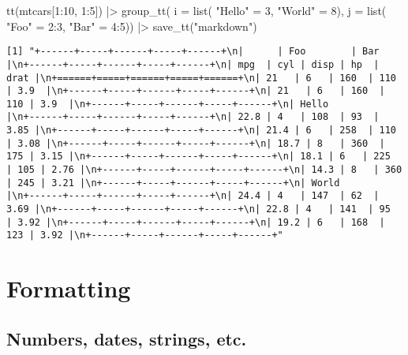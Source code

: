\documentclass[
  letterpaper,
  DIV=11,
  numbers=noendperiod]{scrartcl}
\newenvironment{Shaded}{\begin{snugshade}}{\end{snugshade}}
\newcommand{\AttributeTok}[1]{\textcolor[rgb]{0.40,0.45,0.13}{#1}}
\newcommand{\DecValTok}[1]{\textcolor[rgb]{0.68,0.00,0.00}{#1}}
\newcommand{\FunctionTok}[1]{\textcolor[rgb]{0.28,0.35,0.67}{#1}}
\newcommand{\NormalTok}[1]{\textcolor[rgb]{0.00,0.23,0.31}{#1}}
\newcommand{\OtherTok}[1]{\textcolor[rgb]{0.00,0.23,0.31}{#1}}
\newcommand{\SpecialCharTok}[1]{\textcolor[rgb]{0.37,0.37,0.37}{#1}}
\newcommand{\StringTok}[1]{\textcolor[rgb]{0.13,0.47,0.30}{#1}}
\begin{document}
\begin{Shaded}
\begin{Highlighting}[]
\FunctionTok{tt}\NormalTok{(mtcars[}\DecValTok{1}\SpecialCharTok{:}\DecValTok{10}\NormalTok{, }\DecValTok{1}\SpecialCharTok{:}\DecValTok{5}\NormalTok{]) }\SpecialCharTok{|\textgreater{}}
  \FunctionTok{group\_tt}\NormalTok{(}
    \AttributeTok{i =} \FunctionTok{list}\NormalTok{(}
      \StringTok{"Hello"} \OtherTok{=} \DecValTok{3}\NormalTok{,}
      \StringTok{"World"} \OtherTok{=} \DecValTok{8}\NormalTok{),}
    \AttributeTok{j =} \FunctionTok{list}\NormalTok{(}
      \StringTok{"Foo"} \OtherTok{=} \DecValTok{2}\SpecialCharTok{:}\DecValTok{3}\NormalTok{,}
      \StringTok{"Bar"} \OtherTok{=} \DecValTok{4}\SpecialCharTok{:}\DecValTok{5}\NormalTok{)) }\SpecialCharTok{|\textgreater{}}
  \FunctionTok{save\_tt}\NormalTok{(}\StringTok{"markdown"}\NormalTok{)}
\end{Highlighting}
\end{Shaded}

\begin{verbatim}
[1] "+------+-----+------+-----+------+\n|      | Foo        | Bar        |\n+------+-----+------+-----+------+\n| mpg  | cyl | disp | hp  | drat |\n+======+=====+======+=====+======+\n| 21   | 6   | 160  | 110 | 3.9  |\n+------+-----+------+-----+------+\n| 21   | 6   | 160  | 110 | 3.9  |\n+------+-----+------+-----+------+\n| Hello                          |\n+------+-----+------+-----+------+\n| 22.8 | 4   | 108  | 93  | 3.85 |\n+------+-----+------+-----+------+\n| 21.4 | 6   | 258  | 110 | 3.08 |\n+------+-----+------+-----+------+\n| 18.7 | 8   | 360  | 175 | 3.15 |\n+------+-----+------+-----+------+\n| 18.1 | 6   | 225  | 105 | 2.76 |\n+------+-----+------+-----+------+\n| 14.3 | 8   | 360  | 245 | 3.21 |\n+------+-----+------+-----+------+\n| World                          |\n+------+-----+------+-----+------+\n| 24.4 | 4   | 147  | 62  | 3.69 |\n+------+-----+------+-----+------+\n| 22.8 | 4   | 141  | 95  | 3.92 |\n+------+-----+------+-----+------+\n| 19.2 | 6   | 168  | 123 | 3.92 |\n+------+-----+------+-----+------+"
\end{verbatim}

\section{Formatting}\label{formatting}

\subsection{Numbers, dates, strings,
etc.}\label{numbers-dates-strings-etc.}
\end{document}
